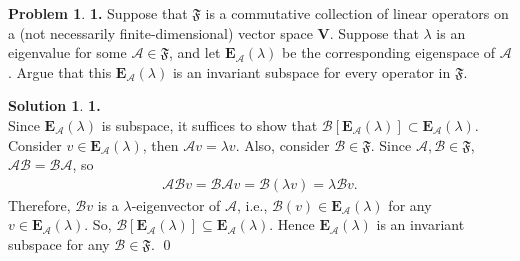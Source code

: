 \documentclass{book}
\theoremstyle{definition}
\newtheorem*{prob*}{Problem}
\newtheorem*{sln*}{Solution}
\newcommand{\V}{\mathbf{V}}
\newcommand{\A}{\mathcal{A}}
\newcommand{\FF}{\mathfrak{F}}
\begin{document}
\begin{prob*}\textbf{1.} Suppose that $\mathfrak{F}$ is a commutative collection of linear operators on a (not necessarily finite-dimensional) vector space $\V$. Suppose that $\lambda$ is an eigenvalue for some $\A \in \mathfrak{F}$, and let $\mathbf{E}_\A(\lambda)$ be the corresponding eigenspace of $\A$. Argue that this $\mathbf{E}_\A(\lambda)$ is an invariant subspace for every operator in $\mathfrak{F}$.\\
	
	\begin{sln*}\textbf{1.} \\
		
		Since $\textbf{E}_\A(\lambda)$ is subspace, it suffices to show that $\mathcal{B}[\textbf{E}_\A(\lambda)] \subset \textbf{E}_\A(\lambda) $.\\
				
		Consider $v \in \textbf{E}_\A(\lambda)$, then $\A v = \lambda v$. Also, consider $\mathcal{B} \in \FF$. Since $\A, \mathcal{B} \in \FF$, $\A \mathcal{B} = \mathcal{B} \A$, so
		\begin{align*}
		\A \mathcal{B} v = \mathcal{B}\A v = \mathcal{B} (\lambda v) = \lambda \mathcal{B}v.
		\end{align*}
		Therefore, $\mathcal{B}v$ is a $\lambda$-eigenvector of $\A$, i.e., $\mathcal{B}(v) \in \textbf{E}_\A(\lambda)$ for any $v \in \textbf{E}_\A(\lambda)$. So, $\mathcal{B}[\textbf{E}_\A(\lambda)] \subseteq \textbf{E}_\A(\lambda)$. Hence $\textbf{E}_\A(\lambda)$ is an invariant subspace for any $\mathcal{B}\in \FF$. \qed
		
	\end{sln*}
	
\end{prob*}

\newpage
\end{document}
